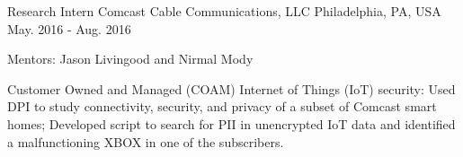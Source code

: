 \begin{cventries}
{\begin{cvitems}
      \end{cvitems}
    }

  \cventry
    {Research Intern} %
    {Comcast Cable Communications, LLC} %
    {Philadelphia, PA, USA} %
    {May. 2016 - Aug. 2016} %
    {
      \begin{cvitems} %
    \item {Mentors: Jason Livingood and Nirmal Mody}
    \item {Customer Owned and Managed (COAM) Internet of Things (IoT) security: Used DPI to study connectivity, security, and privacy of a subset of Comcast smart homes; Developed script to search for PII in unencrypted IoT data and identified a malfunctioning XBOX in one of the subscribers.}
      \end{cvitems}
    }


\end{cventries}
